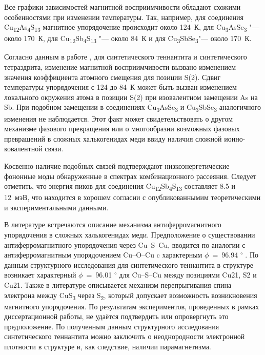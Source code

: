 Все графики зависимостей магнитной восприимчивости обладают схожими особенностями при изменении температуры. Так, например, для соединения Cu\textsubscript{12}As\textsubscript{4}S\textsubscript{13} магнитное упорядочение происходит около 124~К, для Cu\textsubscript{3}AsSe\textsubscript{3} "--- около 170~К, для Cu\textsubscript{12}Sb\textsubscript{4}S\textsubscript{13}  "--- около 84~К и для Cu\textsubscript{3}SbSe\textsubscript{3}"--- около 170~К.

Согласно данным в работе \cite{Nasonova2016}, для синтетического теннантита и синтетического тетраэдрита, изменение магнитной восприимчивости вызвано изменением значения коэффициента атомного смещения для позиции S(2). Сдвиг температуры упорядочения с 124 до 84~К может быть вызван изменением локального окружения атома в позиции S(2) при изовалентном замещении As на Sb.
При подобном замещении в соединениях Cu\textsubscript{3}AsSe\textsubscript{3} и Cu\textsubscript{3}SbSe\textsubscript{3} аналогичного изменения не наблюдается. Этот факт может свидетельствовать о другом механизме фазового превращения или о многообразии возможных фазовых превращений в сложных халькогенидах меди ввиду наличия сложной ионно-ковалентной связи.

Косвенно наличие подобных связей подтверждают низкоэнергетические фононные моды обнаруженные в спектрах комбинационного рассеяния. Следует отметить, что энергия пиков для соединения Cu\textsubscript{12}Sb\textsubscript{4}S\textsubscript{13} составляет 8.5  и 12~мэВ, что находится в хорошем согласии с опубликованнымим теоретическими\cite{Lai_2015} и экспериментальными\cite{May2016} данными.

В литературе встречаются описание механизма антиферромагнитного упорядочения в сложных халькогенидах меди. Предположение о существовании антиферромагнитного упорядочения через Cu--S--Cu, вводится по аналогии с антиферромагнитным упорядочением Cu--O--Cu\cite{Crawford1976} c характерным $\phi$~=~96.94\textsuperscript{ $\circ$ }. По данным структурного исследования для синтетического теннантита в структуре возникает характерный $\phi$~=~96.01\textsuperscript{ $\circ$ } для Cu--S--Cu между позициями Cu21, S2 и Cu21. Также в литературе описывается механизм\cite{Gainov2008,Gainov_2006} перепрыгивания спина электрона между CuS\textsubscript{3} через S\textsubscript{2}, который допускает возможность возникновения магнитного упорядочения. По результатам экспериментов, проведенных в рамках диссертационной работы, не удаётся подтвердить или опровергнуть это предположение. По полученным данным структурного исследования синтетического теннантита можно заключить о неоднородности электронной плотности в структуре и, как следствие, наличии парамагнетизма.


